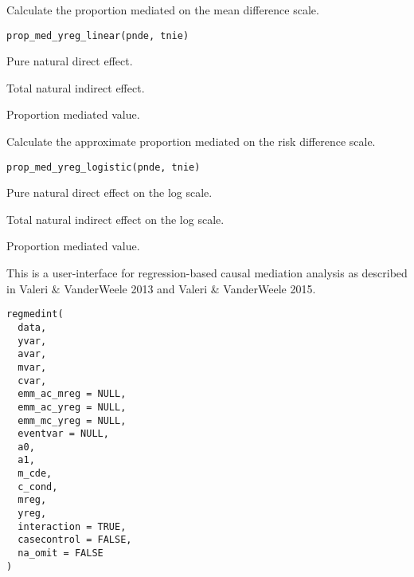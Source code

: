 \documentclass[a4paper]{book}
\begin{document}
%
\begin{Description}
Calculate the proportion mediated on the mean difference scale.
\end{Description}
%
\begin{Usage}
\begin{verbatim}
prop_med_yreg_linear(pnde, tnie)
\end{verbatim}
\end{Usage}
%
\begin{Arguments}
\begin{ldescription}
\item[\code{pnde}] Pure natural direct effect.

\item[\code{tnie}] Total natural indirect effect.
\end{ldescription}
\end{Arguments}
%
\begin{Value}
Proportion mediated value.
\end{Value}
%
\begin{Description}
Calculate the approximate proportion mediated on the risk difference scale.
\end{Description}
%
\begin{Usage}
\begin{verbatim}
prop_med_yreg_logistic(pnde, tnie)
\end{verbatim}
\end{Usage}
%
\begin{Arguments}
\begin{ldescription}
\item[\code{pnde}] Pure natural direct effect on the log scale.

\item[\code{tnie}] Total natural indirect effect on the log scale.
\end{ldescription}
\end{Arguments}
%
\begin{Value}
Proportion mediated value.
\end{Value}
%
\begin{Description}
This is a user-interface for regression-based causal mediation analysis as described in Valeri \& VanderWeele 2013 and Valeri \& VanderWeele 2015.
\end{Description}
%
\begin{Usage}
\begin{verbatim}
regmedint(
  data,
  yvar,
  avar,
  mvar,
  cvar,
  emm_ac_mreg = NULL,
  emm_ac_yreg = NULL,
  emm_mc_yreg = NULL,
  eventvar = NULL,
  a0,
  a1,
  m_cde,
  c_cond,
  mreg,
  yreg,
  interaction = TRUE,
  casecontrol = FALSE,
  na_omit = FALSE
)
\end{verbatim}
\end{Usage}
\end{document}
